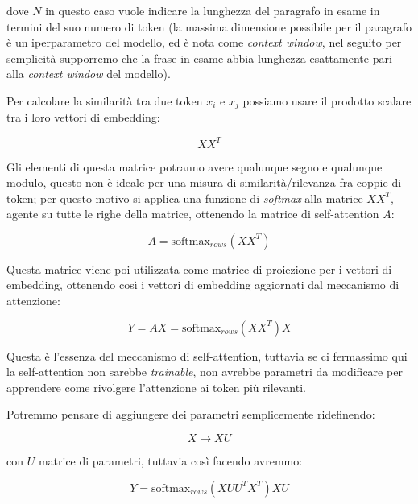 dove \(N\) in questo caso vuole indicare la lunghezza del paragrafo in esame in termini del suo numero di token (la massima dimensione possibile per il paragrafo è un iperparametro del modello, ed è nota come \textit{context window}, nel seguito per semplicità supporremo che la frase in esame abbia lunghezza esattamente pari alla \textit{context window} del modello).

Per calcolare la similarità tra due token \(x_i\) e \(x_j\) possiamo usare il prodotto scalare tra i loro vettori di embedding:

\begin{equation}
    XX^T
\end{equation}

Gli elementi di questa matrice potranno avere qualunque segno e qualunque modulo, questo non è ideale per una misura di similarità/rilevanza fra coppie di token; per questo motivo si applica una funzione di \textit{softmax} alla matrice \(XX^T\), agente su tutte le righe della matrice, ottenendo la matrice di self-attention \(A\):

\begin{equation}
    A = \text{softmax}_{rows}(XX^T)
\end{equation}

Questa matrice viene poi utilizzata come matrice di proiezione per i vettori di embedding, ottenendo così i vettori di embedding aggiornati dal meccanismo di attenzione:

\begin{equation}
    Y = AX = \text{softmax}_{rows}(XX^T)X
    \label{naive_self_attention} 
\end{equation}

Questa è l'essenza del meccanismo di self-attention, tuttavia se ci fermassimo qui la self-attention non sarebbe \textit{trainable}, non avrebbe parametri da modificare per apprendere come rivolgere l'attenzione ai token più rilevanti.

Potremmo pensare di aggiungere dei parametri semplicemente ridefinendo:

\begin{equation}
    X \to XU
\end{equation}

con \(U\) matrice di parametri, tuttavia così facendo avremmo:

\begin{equation}
    Y = \text{softmax}_{rows}(XUU^TX^T)XU
\end{equation}

